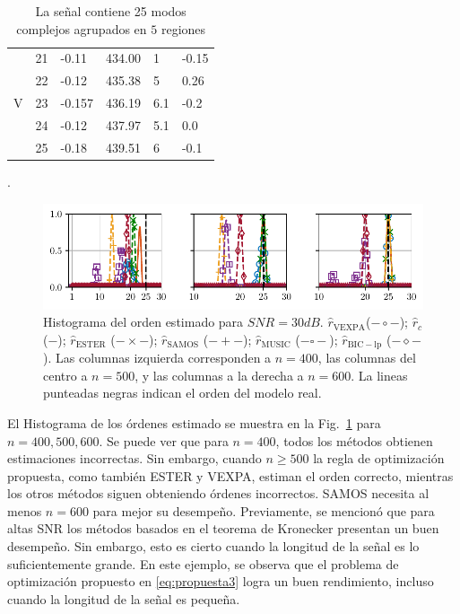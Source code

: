 \begin{table}[H]
\begin{tabular}{clllll}
		\hline 
		\multirow{5}{*}{V}           
		& 21 & -0.11      & 434.00  & 1      & -0.15        \\ %
		& 22 & -0.12      & 435.38  & 5      & 0.26         \\ %
		& 23 & -0.157     & 436.19  & 6.1    & -0.2         \\ %
		& 24 & -0.12      & 437.97  & 5.1    & 0.0          \\ %
		& 25 & -0.18      & 439.51  & 6      & -0.1         \\ %
		\hline 
	\end{tabular}
	\caption{La señal contiene 25 modos complejos agrupados en $5$ regiones}.\label{Table:Cuyt}
\end{table}			
			

\begin{figure}[h!]
	\centering
	\includegraphics[width=\linewidth]{Figuras/Histogram_order_cuyt_vexpa.pdf}
	\caption{Histograma del orden estimado para $SNR = 30dB$. $\hat{r}_{\mathrm{VEXPA}}$($-\circ-$); $\hat{r}_c$ ($-$); $\hat{r}_{\mathrm{ESTER}}$ ($-\times-$); $\hat{r}_{\mathrm{SAMOS}}$ ($-+-$); $\hat{r}_{\mathrm{MUSIC}}$ ($-\square-$); $\hat{r}_{\mathrm{BIC-lp}}$ ($-\diamond-$). Las columnas izquierda corresponden a $n=400$, las columnas del centro a $n=500$, y las columnas a la derecha a $n=600$. La lineas punteadas negras indican el orden del modelo real.}
	\label{Fig:cuyt}
\end{figure}
El Histograma de los órdenes estimado se muestra en la Fig.~\ref{Fig:cuyt} para $n=400,500,600$. Se puede ver que para $n=400$, todos los métodos obtienen estimaciones incorrectas. Sin embargo, cuando $n\ge 500$ la regla de optimización propuesta, como también ESTER y VEXPA, estiman el orden correcto, mientras los otros métodos siguen obteniendo órdenes incorrectos. SAMOS necesita al menos  $n=600$ para mejor su desempeño. Previamente, se mencionó que para altas SNR los métodos basados en el teorema de Kronecker presentan un buen desempeño. Sin embargo, esto es cierto cuando la longitud de la señal es lo suficientemente grande. En este ejemplo, se observa que el problema de optimización propuesto en \eqref{eq:propuesta3} logra un buen rendimiento, incluso cuando la longitud de la señal es pequeña.

